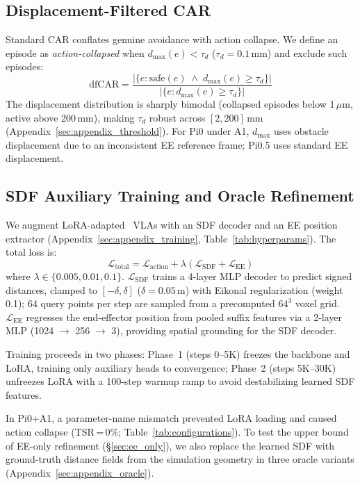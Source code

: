 \subsection{Displacement-Filtered CAR}\label{sec:dfcar}

Standard CAR conflates genuine avoidance with action collapse. We define an episode as \emph{action-collapsed} when $d_{\max}(e) < \tau_d$ ($\tau_d = 0.1$\,mm) and exclude such episodes:
\begin{equation}
\text{dfCAR} = \frac{|\{e : \text{safe}(e) \;\land\; d_{\max}(e) \geq \tau_d\}|}{|\{e : d_{\max}(e) \geq \tau_d\}|}
\end{equation}
The displacement distribution is sharply bimodal (collapsed episodes below 1\,$\mu$m, active above 200\,mm), making $\tau_d$ robust across $[2, 200]$\,mm (Appendix~\ref{sec:appendix_threshold}). For Pi0 under A1, $d_{\max}$ uses obstacle displacement due to an inconsistent EE reference frame; Pi0.5 uses standard EE displacement.

\subsection{SDF Auxiliary Training and Oracle Refinement}\label{sec:sdf_aux}

We augment LoRA-adapted~\cite{hu2022lora} VLAs with an SDF decoder and an EE position extractor (Appendix~\ref{sec:appendix_training}, Table~\ref{tab:hyperparams}). The total loss is:
\begin{equation}
\mathcal{L}_\text{total} = \mathcal{L}_\text{action} + \lambda \left( \mathcal{L}_\text{SDF} + \mathcal{L}_\text{EE} \right)
\end{equation}
where $\lambda \in \{0.005, 0.01, 0.1\}$. $\mathcal{L}_\text{SDF}$ trains a 4-layer MLP decoder to predict signed distances, clamped to $[-\delta, \delta]$ ($\delta = 0.05$\,m) with Eikonal regularization (weight 0.1); 64 query points per step are sampled from a precomputed $64^3$ voxel grid. $\mathcal{L}_\text{EE}$ regresses the end-effector position from pooled suffix features via a 2-layer MLP (1024 $\to$ 256 $\to$ 3), providing spatial grounding for the SDF decoder.

Training proceeds in two phases: Phase~1 (steps 0--5K) freezes the backbone and LoRA, training only auxiliary heads to convergence; Phase~2 (steps 5K--30K) unfreezes LoRA with a 100-step warmup ramp to avoid destabilizing learned SDF features.

In Pi0+A1, a parameter-name mismatch prevented LoRA loading and caused action collapse (TSR\,=\,0\%; Table~\ref{tab:configurations}). To test the upper bound of EE-only refinement (\S\ref{sec:ee_only}), we also replace the learned SDF with ground-truth distance fields from the simulation geometry in three oracle variants (Appendix~\ref{sec:appendix_oracle}).\label{sec:oracle_setup}
